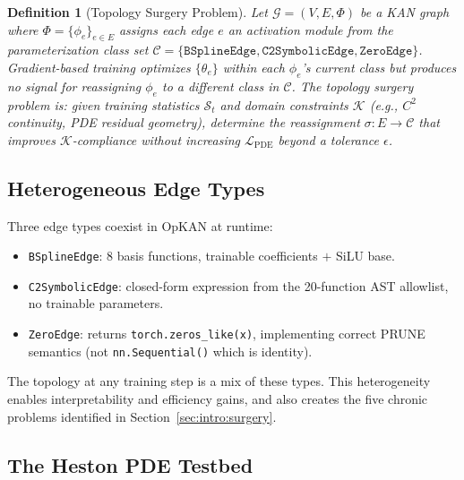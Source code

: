 \documentclass[11pt,a4paper]{article}
\newtheorem{definition}{Definition}
\begin{document}
\begin{definition}[Topology Surgery Problem]
Let $\mathcal{G} = (V, E, \Phi)$ be a KAN graph where $\Phi = \{\phi_e\}_{e \in E}$
assigns each edge $e$ an activation module from the parameterization class set
$\mathcal{C} = \{\texttt{BSplineEdge}, \texttt{C2SymbolicEdge}, \texttt{ZeroEdge}\}$.
Gradient-based training optimizes $\{\theta_e\}$ within each $\phi_e$'s current class
but produces no signal for reassigning $\phi_e$ to a different class in $\mathcal{C}$.
The \emph{topology surgery problem} is: given training statistics $\mathcal{S}_t$ and
domain constraints $\mathcal{K}$ (e.g., $C^2$ continuity, PDE residual geometry),
determine the reassignment $\sigma: E \to \mathcal{C}$ that improves $\mathcal{K}$-compliance
without increasing $\mathcal{L}_\text{PDE}$ beyond a tolerance $\epsilon$.
\end{definition}

\subsection{Heterogeneous Edge Types}
\label{sec:background:heterogeneous}

Three edge types coexist in OpKAN at runtime:
\begin{itemize}[nosep]
  \item \texttt{BSplineEdge}: 8 basis functions, trainable coefficients $+$ SiLU base.
  \item \texttt{C2SymbolicEdge}: closed-form expression from the 20-function AST
  allowlist, no trainable parameters.
  \item \texttt{ZeroEdge}: returns \texttt{torch.zeros\_like(x)}, implementing correct PRUNE
  semantics (not \texttt{nn.Sequential()} which is identity).
\end{itemize}

The topology at any training step is a mix of these types. This heterogeneity enables
interpretability and efficiency gains, and also creates the five chronic problems
identified in Section~\ref{sec:intro:surgery}.

\subsection{The Heston PDE Testbed}
\label{sec:background:heston}
\end{document}
